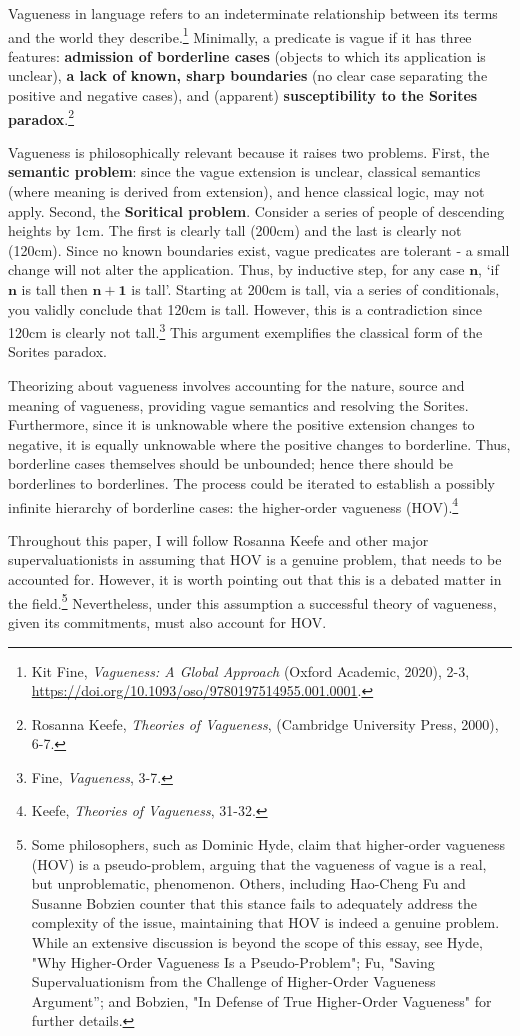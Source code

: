 Vagueness in language refers to an indeterminate relationship between
its terms and the world they describe.\footnote{Kit Fine,
  \emph{Vagueness: A Global Approach} (Oxford Academic, 2020), 2-3,
  \url{https://doi.org/10.1093/oso/9780197514955.001.0001}.} Minimally,
a predicate is vague if it has three features: \textbf{admission of
borderline cases} (objects to which its application is unclear),
\textbf{a lack of known, sharp boundaries} (no clear case separating the
positive and negative cases), and (apparent) \textbf{susceptibility to
the Sorites paradox}.\footnote{Rosanna Keefe, \emph{Theories of
  Vagueness}, (Cambridge University Press, 2000), 6-7.}

Vagueness is philosophically relevant because it raises two problems.
First, the \textbf{semantic problem}: since the vague extension is
unclear, classical semantics (where meaning is derived from extension),
and hence classical logic, may not apply. Second, the \textbf{Soritical
problem}. Consider a series of people of descending heights by 1cm. The
first is clearly tall (200cm) and the last is clearly not (120cm). Since
no known boundaries exist, vague predicates are tolerant - a small
change will not alter the application. Thus, by inductive step, for any
case $\mathbf{n}$, `if $\mathbf{n}$ is tall then $\mathbf{n+1}$ is tall'.
Starting at 200cm is tall, via a series of conditionals, you validly
conclude that 120cm is tall. However, this is a contradiction since
120cm is clearly not tall.\footnote{Fine, \emph{Vagueness}, 3-7.} This
argument exemplifies the classical form of the Sorites paradox.

Theorizing about vagueness involves accounting for the nature, source
and meaning of vagueness, providing vague semantics and resolving the
Sorites. Furthermore, since it is unknowable where the positive
extension changes to negative, it is equally unknowable where the
positive changes to borderline. Thus, borderline cases themselves should
be unbounded; hence there should be borderlines to borderlines. The
process could be iterated to establish a possibly infinite hierarchy of
borderline cases: the higher-order vagueness (HOV).\footnote{Keefe,
  \emph{Theories of Vagueness}, 31-32.}

Throughout this paper, I will follow Rosanna Keefe and other major
supervaluationists in assuming that HOV is a genuine problem, that needs
to be accounted for. However, it is worth pointing out that this is a
debated matter in the field.\footnote{Some philosophers, such as Dominic
  Hyde, claim that higher-order vagueness (HOV) is a pseudo-problem,
  arguing that the vagueness of vague is a real, but unproblematic,
  phenomenon. Others, including Hao-Cheng Fu and Susanne Bobzien counter
  that this stance fails to adequately address the complexity of the
  issue, maintaining that HOV is indeed a genuine problem. While an
  extensive discussion is beyond the scope of this essay, see Hyde, "Why
  Higher-Order Vagueness Is a Pseudo-Problem"; Fu, "Saving
  Supervaluationism from the Challenge of Higher-Order Vagueness
  Argument''; and Bobzien, "In Defense of True Higher-Order Vagueness"
  for further details.} Nevertheless, under this assumption a successful
theory of vagueness, given its commitments, must also account for HOV.

